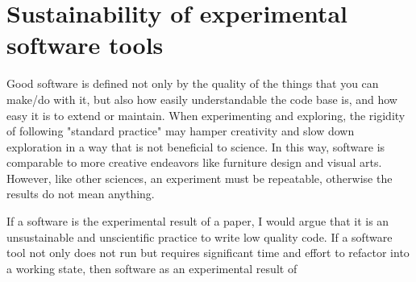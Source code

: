 


\section{Sustainability of experimental software tools}

Good software is defined not only by the quality of the things that you can make/do with it, but also how easily understandable the code base is, and how easy it is to extend or maintain. When experimenting and exploring, the rigidity of following "standard practice" may hamper creativity and slow down exploration in a way that is not beneficial to science. In this way, software is comparable to more creative endeavors like furniture design and visual arts. However, like other sciences, an experiment must be repeatable, otherwise the results do not mean anything. 


If a software is the experimental result of a paper, I would argue that it is an unsustainable and unscientific practice to write low quality code. If a software tool not only does not run but requires significant time and effort to refactor into a working state, then software as an experimental result of 
